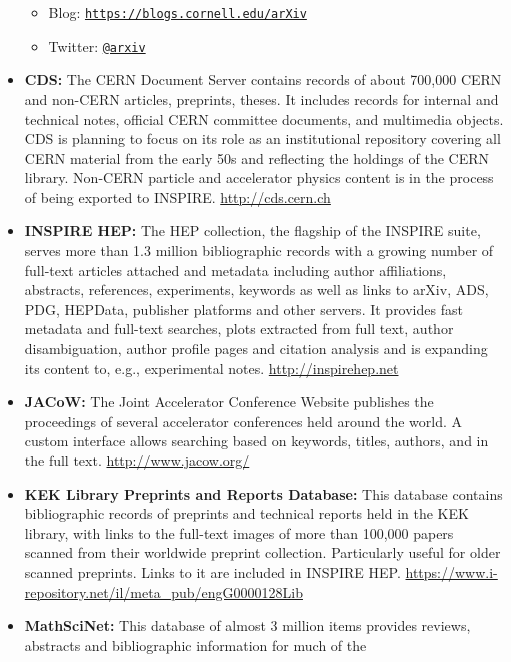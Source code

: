 \begin{itemize}
  \begin{itemize}
  \tightlist
  \item
    Blog:
    \href{https://blogs.cornell.edu/arXiv}{\texttt{https://blogs.cornell.edu/arXiv}}
  \item
    Twitter: \href{https://twitter.com/arxiv}{\texttt{@arxiv}}
  \end{itemize}
\item
  \textbf{CDS:} The CERN Document Server contains records of about
  700,000 CERN and non-CERN articles, preprints, theses. It includes
  records for internal and technical notes, official CERN committee
  documents, and multimedia objects. CDS is planning to focus on its
  role as an institutional repository covering all CERN material from
  the early 50s and reflecting the holdings of the CERN library.
  Non-CERN particle and accelerator physics content is in the process of
  being exported to INSPIRE. \url{http://cds.cern.ch}
\item
  \textbf{INSPIRE HEP:} The HEP collection, the flagship of the INSPIRE
  suite, serves more than 1.3 million bibliographic records with a
  growing number of full-text articles attached and metadata including
  author affiliations, abstracts, references, experiments, keywords as
  well as links to arXiv, ADS, PDG, HEPData, publisher platforms and
  other servers. It provides fast metadata and full-text searches, plots
  extracted from full text, author disambiguation, author profile pages
  and citation analysis and is expanding its content to, e.g.,
  experimental notes. \url{http://inspirehep.net}
\item
  \textbf{JACoW:} The Joint Accelerator Conference Website publishes the
  proceedings of several accelerator conferences held around the world.
  A custom interface allows searching based on keywords, titles,
  authors, and in the full text. \url{http://www.jacow.org/}
\item
  \textbf{KEK Library Preprints and Reports Database:} This database
  contains bibliographic records of preprints and technical reports held
  in the KEK library, with links to the full-text images of more than
  100,000 papers scanned from their worldwide preprint collection.
  Particularly useful for older scanned preprints. Links to it are
  included in INSPIRE HEP.
  \url{https://www.i-repository.net/il/meta_pub/engG0000128Lib}
\item
  \textbf{MathSciNet:} This database of almost 3 million items provides
  reviews, abstracts and bibliographic information for much of the

\end{itemize}

